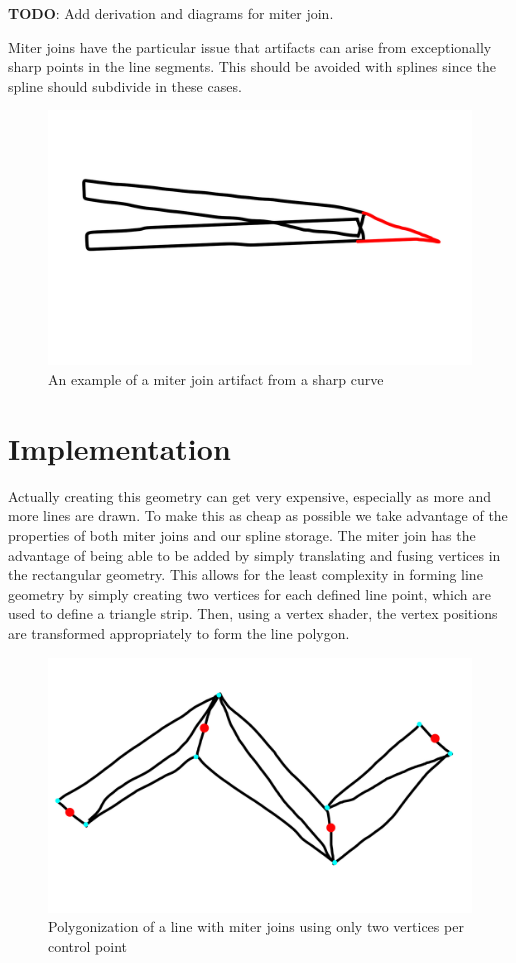 \documentclass[12pt]{report}
\begin{document}
\noindent \textbf{TODO}: Add derivation and diagrams for miter join.

Miter joins have the particular issue that artifacts can arise from exceptionally sharp points in the line segments. 
This should be avoided with splines since the spline should subdivide in these cases.

\begin{figure}
\includegraphics[width=\textwidth]{miterartifact.jpg}
\caption{An example of a miter join artifact from a sharp curve}
\end{figure}

\section{Implementation}

Actually creating this geometry can get very expensive, especially as more and more lines are drawn. 
To make this as cheap as possible we take advantage of the properties of both miter joins and our spline storage.
The miter join has the advantage of being able to be added by simply translating and fusing vertices in the rectangular geometry. 
This allows for the least complexity in forming line geometry by simply creating two vertices for each defined line point, which are used to define a triangle strip. 
Then, using a vertex shader, the vertex positions are transformed appropriately to form the line polygon.

\begin{figure}
	\includegraphics[width=\textwidth]{miterpolys.jpg}
	\caption{Polygonization of a line with miter joins using only two vertices per control point}
\end{figure}
\end{document}
